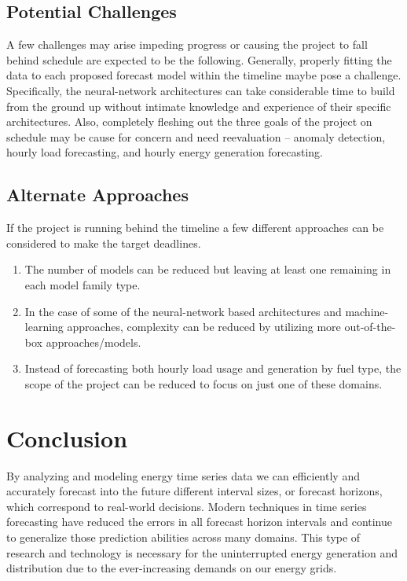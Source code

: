 \documentclass[sigconf]{acmart}
\begin{document}
\subsection{Potential Challenges}
A few challenges may arise impeding progress or causing the project to fall behind schedule are expected to be the following. 
Generally, properly fitting the data to each proposed forecast model within the timeline maybe pose a challenge. Specifically, the neural-network architectures can take considerable time to build from the ground up without intimate knowledge and experience of their specific architectures. Also, completely fleshing out the three goals of the project on schedule may be cause for concern and need reevaluation -- anomaly detection, hourly load forecasting, and hourly energy generation forecasting.

\subsection{Alternate Approaches}
If the project is running behind the timeline a few different approaches can be considered to make the target deadlines. 

\begin{enumerate}
  \item The number of models can be reduced but leaving at least one remaining in each model family type. 
  \item In the case of some of the neural-network based architectures and machine-learning approaches, complexity can be reduced by utilizing more out-of-the-box approaches/models. 
  \item Instead of forecasting both hourly load usage and generation by fuel type, the scope of the project can be reduced to focus on just one of these domains.
\end{enumerate}

\section{Conclusion}
By analyzing and modeling energy time series data we can efficiently and accurately forecast into the future different interval sizes, or forecast horizons, which correspond to real-world decisions. Modern techniques in time series forecasting have reduced the errors in all forecast horizon intervals and continue to generalize those prediction abilities across many domains. This type of research and technology is necessary for the uninterrupted energy generation and distribution due to the ever-increasing demands on our energy grids.
\end{document}
